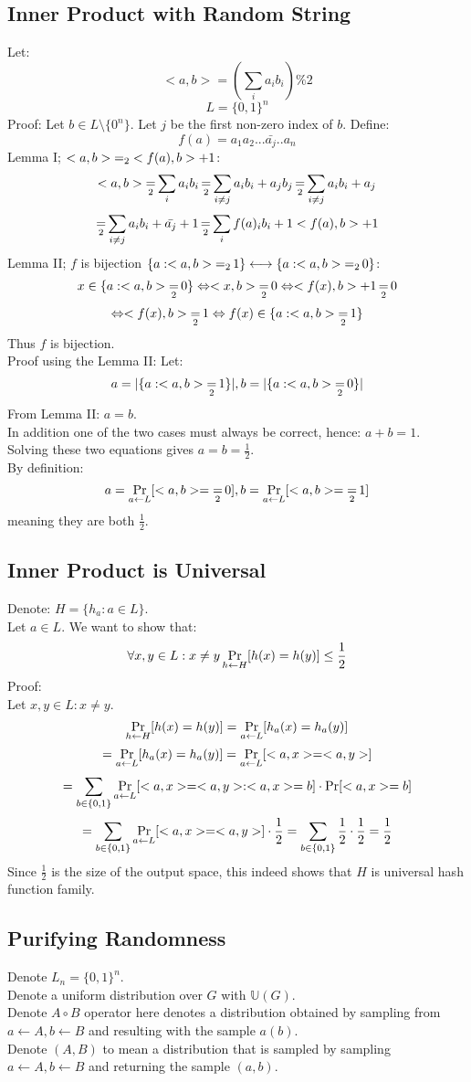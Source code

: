 
\subsection{Inner Product with Random String}
Let:
\[
	<a,b>=(\sum_ia_ib_i)\%2
\]\[
	L=\{0,1\}^n
\]
Proof:
Let $b\in L\setminus\{0^n\}$. Let $j$ be the first non-zero index of $b$. Define:
\[
	f(a)=a_1a_2...\bar{a_j}..a_n	
\]
Lemma I; $<a,b>\operatorname*{=}_2 <f(a),b>+1$:
\[
	<a,b>\operatorname*{=}_2\sum_ia_ib_i\operatorname*{=}_2 \sum_{i\neq j}a_ib_i+a_jb_j
	\operatorname*{=}_2 \sum_{i\neq j}a_ib_i+a_j
\]\[
	\operatorname*{=}_2 \sum_{i\neq j}a_ib_i+\bar{a_j}+1
	\operatorname*{=}_2 \sum_if(a)_ib_i+1
	<f(a),b>+1
\]
Lemma II; $f$ is bijection $\{a:<a,b>\operatorname*{=}_21\}\longleftrightarrow\{a:<a,b>\operatorname*{=}_20\}$:\\
\[
	x\in\{a:<a,b>\operatorname*{=}_20\}\Leftrightarrow 
	<x,b>\operatorname*{=}_20\Leftrightarrow 
	<f(x),b>+1\operatorname*{=}_20 
\]\[
	\Leftrightarrow
	<f(x),b>\operatorname*{=}_21\Leftrightarrow 
	f(x)\in\{a:<a,b>\operatorname*{=}_21\}
\]
Thus $f$ is bijection.\\
Proof using the Lemma II: Let:
\[
	a=|\{a:<a,b>\operatorname*{=}_21\}|,
	b=|\{a:<a,b>\operatorname*{=}_20\}|
\]
From Lemma II: $a=b$.\\
In addition one of the two cases must always be correct, hence: $a+b=1$.\\
Solving these two equations gives $a=b=\frac{1}{2}$.\\
By definition:
\[
	a=\operatorname*{Pr}_{a\leftarrow L}[<a,b>=\operatorname*{=}_2 0],
	b=\operatorname*{Pr}_{a\leftarrow L}[<a,b>=\operatorname*{=}_2 1]	
\]
meaning they are both $\frac{1}{2}$.

\subsection{Inner Product is Universal}
Denote: $H=\{h_a:a\in L\}$.\\
Let $a\in L$.
We want to show that:
\[
	\forall x,y\in L:x\neq y
	\operatorname*{Pr}_{h\leftarrow H}[h(x)=h(y)]\leq \frac{1}{2}
\]
Proof:\\
Let $x,y\in L:x\neq y$.
\[
	\operatorname*{Pr}_{h\leftarrow H}[h(x)=h(y)]=
	\operatorname*{Pr}_{a\leftarrow L}[h_a(x)=h_a(y)]
\]\[
	=\operatorname*{Pr}_{a\leftarrow L}[h_a(x)=h_a(y)]
	=\operatorname*{Pr}_{a\leftarrow L}[<a,x>=<a,y>]
\]\[
	=\sum_{b\in\{0,1\}}\operatorname*{Pr}_{a\leftarrow L}[<a,x>=<a,y>:<a,x>=b]\cdot\operatorname*{Pr}[<a,x>=b]	
\]\[
	=\sum_{b\in\{0,1\}}\operatorname*{Pr}_{a\leftarrow L}[<a,x>=<a,y>]\cdot\frac{1}{2}	
	=\sum_{b\in\{0,1\}}\frac{1}{2}\cdot\frac{1}{2}
	=\frac{1}{2}
\]
Since $\frac{1}{2}$ is the size of the output space, this indeed shows that $H$ is
universal hash function family.

\subsection{Purifying Randomness}
Denote $L_n=\{0,1\}^n$.\\
Denote a uniform distribution over $G$ with $\mathbb{U}(G)$.\\
Denote $A\circ B$ operator here denotes a distribution obtained
by sampling from $a\leftarrow A, b\leftarrow B$ and resulting
with the sample $a(b)$.\\
Denote $(A,B)$ to mean a distribution that is sampled
by sampling $a\leftarrow A, b\leftarrow B$ and returning
the sample $(a,b)$.\\


